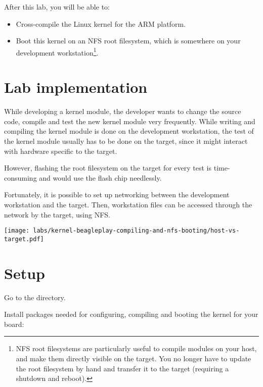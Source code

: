 
After this lab, you will be able to:
\begin{itemize}

\item Cross-compile the Linux kernel for the ARM platform.

\item Boot this kernel on an NFS root filesystem, which is somewhere
on your development workstation\footnote{NFS root filesystems are
particularly useful to compile modules on your host, and make them
directly visible on the target. You no longer have to update the root
filesystem by hand and transfer it to the target (requiring a shutdown
and reboot).}.

\end{itemize}

\section{Lab implementation}

While developing a kernel module, the developer wants to change the
source code, compile and test the new kernel module very
frequently. While writing and compiling the kernel module is done on the
development workstation, the test of the kernel module usually has to
be done on the target, since it might interact with hardware specific
to the target.

However, flashing the root filesystem on the target for every test is
time-consuming and would use the flash chip needlessly.

Fortunately, it is possible to set up networking between the
development workstation and the target. Then, workstation files can be
accessed through the network by the target, using NFS.

\begin{center}
\texttt{[image: labs/kernel-beagleplay-compiling-and-nfs-booting/host-vs-target.pdf]}
\end{center}

\section{Setup}

Go to the  directory.

Install packages needed for configuring, compiling and booting
the kernel for your board:

